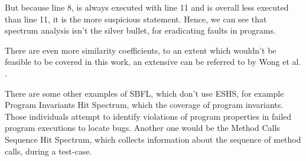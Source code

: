 But because line 8, is always executed with line 11 and is overall less executed than line 11, it is the more suspicious statement.
Hence, we can see that spectrum analysis isn't the silver bullet, for eradicating faults in programs.


There are even more similarity coefficients, to an extent which wouldn't be feasible to be covered in this work, an extensive can be referred to by Wong et al. \cite{wong_survey_2016}.

There are some other examples of SBFL, which don't use ESHS, for example Program Invariants Hit Spectrum, which the coverage of program invariants.
Those individuals attempt to identify violations of program properties in failed program executions to locate bugs.
Another one would be the Method Calls Sequence Hit Spectrum, which collects information about the sequence of method calls, during a test-case.